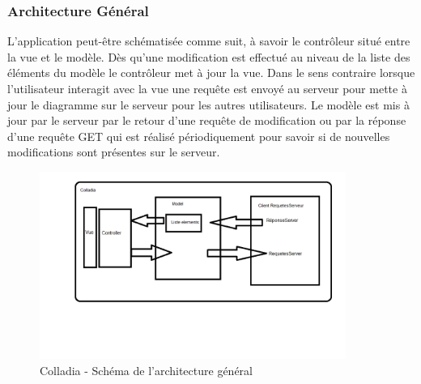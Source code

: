 \subsubsection{Architecture Général}
L'application peut-être schématisée comme suit, à savoir le contrôleur situé entre la vue et le modèle. Dès qu'une modification est effectué au niveau de la liste des éléments du modèle le contrôleur met à jour la vue.
Dans le sens contraire lorsque l'utilisateur interagit avec la vue une requête est envoyé au serveur pour mette à jour le diagramme sur le serveur pour les autres utilisateurs.
Le modèle est mis à jour par le serveur par le retour d'une requête de modification ou par la réponse d'une requête GET qui est réalisé périodiquement pour savoir si de nouvelles modifications sont présentes sur le serveur. 
	\begin{figure}[!h]
		\centering
		\includegraphics[width=10cm]{img/archiGeneral}
		\caption{Colladia - Schéma de l'architecture général}
	\end{figure}
